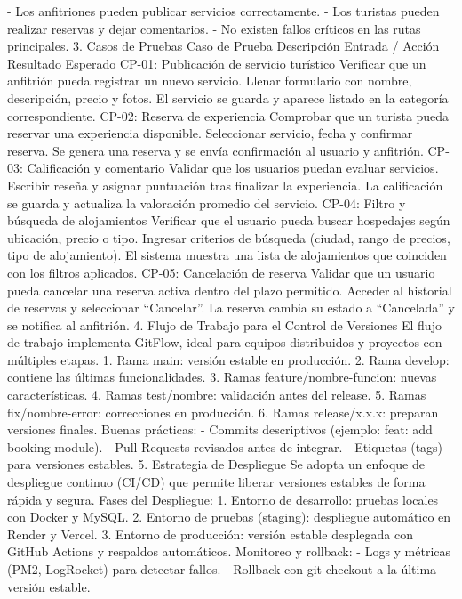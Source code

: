 - Los anfitriones pueden publicar servicios correctamente.
- Los turistas pueden realizar reservas y dejar comentarios.
- No existen fallos críticos en las rutas principales.
3. Casos de Pruebas
Caso de Prueba Descripción Entrada / Acción Resultado
Esperado
CP-01:
Publicación de
servicio turístico
Verificar que un
anfitrión pueda
registrar un
nuevo servicio.
Llenar
formulario con
nombre,
descripción,
precio y fotos.
El servicio se
guarda y
aparece listado
en la categoría
correspondiente.
CP-02: Reserva
de experiencia
Comprobar que
un turista pueda
reservar una
experiencia
disponible.
Seleccionar
servicio, fecha y
confirmar
reserva.
Se genera una
reserva y se
envía
confirmación al
usuario y
anfitrión.
CP-03:
Calificación y
comentario
Validar que los
usuarios
puedan evaluar
servicios.
Escribir reseña y
asignar
puntuación tras
finalizar la
experiencia.
La calificación se
guarda y
actualiza la
valoración
promedio del
servicio.
CP-04: Filtro y
búsqueda de
alojamientos
Verificar que el
usuario pueda
buscar
hospedajes
según
ubicación,
precio o tipo.
Ingresar
criterios de
búsqueda
(ciudad, rango
de precios, tipo
de alojamiento).
El sistema
muestra una
lista de
alojamientos
que coinciden
con los filtros
aplicados.
CP-05:
Cancelación de
reserva
Validar que un
usuario pueda
cancelar una
reserva activa
dentro del plazo
permitido.
Acceder al
historial de
reservas y
seleccionar
“Cancelar”.
La reserva
cambia su
estado a
“Cancelada” y se
notifica al
anfitrión.
4. Flujo de Trabajo para el Control de Versiones
El flujo de trabajo implementa GitFlow, ideal para equipos distribuidos y
proyectos con múltiples etapas.
1. Rama main: versión estable en producción.
2. Rama develop: contiene las últimas funcionalidades.
3. Ramas feature/nombre-funcion: nuevas características.
4. Ramas test/nombre: validación antes del release.
5. Ramas fix/nombre-error: correcciones en producción.
6. Ramas release/x.x.x: preparan versiones finales.
Buenas prácticas:
- Commits descriptivos (ejemplo: feat: add booking module).
- Pull Requests revisados antes de integrar.
- Etiquetas (tags) para versiones estables.
5. Estrategia de Despliegue
Se adopta un enfoque de despliegue continuo (CI/CD) que permite liberar
versiones estables de forma rápida y segura.
Fases del Despliegue:
1. Entorno de desarrollo: pruebas locales con Docker y MySQL.
2. Entorno de pruebas (staging): despliegue automático en Render y
Vercel.
3. Entorno de producción: versión estable desplegada con GitHub Actions
y respaldos automáticos.
Monitoreo y rollback:
- Logs y métricas (PM2, LogRocket) para detectar fallos.
- Rollback con git checkout a la última versión estable.
